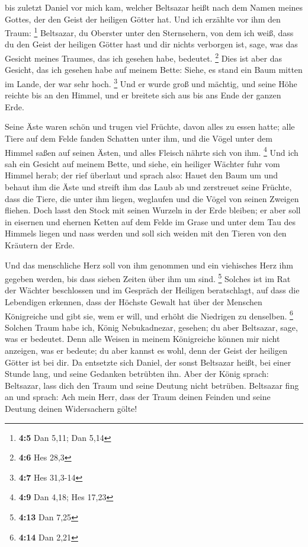  bis zuletzt Daniel vor mich kam, welcher Beltsazar heißt
nach dem Namen meines Gottes, der den Geist der heiligen Götter hat. Und
ich erzählte vor ihm den Traum: \footnote{\textbf{4:5} Dan 5,11; Dan
  5,14}  Beltsazar, du Oberster unter den Sternsehern, von
dem ich weiß, dass du den Geist der heiligen Götter hast und dir nichts
verborgen ist, sage, was das Gesicht meines Traumes, das ich gesehen
habe, bedeutet. \footnote{\textbf{4:6} Hes 28,3}  Dies ist
aber das Gesicht, das ich gesehen habe auf meinem Bette: Siehe, es stand
ein Baum mitten im Lande, der war sehr hoch. \footnote{\textbf{4:7} Hes
  31,3-14}  Und er wurde groß und mächtig, und seine Höhe
reichte bis an den Himmel, und er breitete sich aus bis ans Ende der
ganzen Erde.

 Seine Äste waren schön und trugen viel Früchte, davon
alles zu essen hatte; alle Tiere auf dem Felde fanden Schatten unter
ihm, und die Vögel unter dem Himmel saßen auf seinen Ästen, und alles
Fleisch nährte sich von ihm. \footnote{\textbf{4:9} Dan 4,18; Hes 17,23}
 Und ich sah ein Gesicht auf meinem Bette, und siehe, ein
heiliger Wächter fuhr vom Himmel herab;  der rief
überlaut und sprach also: Hauet den Baum um und behaut ihm die Äste und
streift ihm das Laub ab und zerstreuet seine Früchte, dass die Tiere,
die unter ihm liegen, weglaufen und die Vögel von seinen Zweigen
fliehen.  Doch lasst den Stock mit seinen Wurzeln in der
Erde bleiben; er aber soll in eisernen und ehernen Ketten auf dem Felde
im Grase und unter dem Tau des Himmels liegen und nass werden und soll
sich weiden mit den Tieren von den Kräutern der Erde.

 Und das menschliche Herz soll von ihm genommen und ein
viehisches Herz ihm gegeben werden, bis dass sieben Zeiten über ihm um
sind. \footnote{\textbf{4:13} Dan 7,25}  Solches ist im
Rat der Wächter beschlossen und im Gespräch der Heiligen beratschlagt,
auf dass die Lebendigen erkennen, dass der Höchste Gewalt hat über der
Menschen Königreiche und gibt sie, wem er will, und erhöht die Niedrigen
zu denselben. \footnote{\textbf{4:14} Dan 2,21}  Solchen
Traum habe ich, König Nebukadnezar, gesehen; du aber Beltsazar, sage,
was er bedeutet. Denn alle Weisen in meinem Königreiche können mir nicht
anzeigen, was er bedeute; du aber kannst es wohl, denn der Geist der
heiligen Götter ist bei dir.  Da entsetzte sich Daniel,
der sonst Beltsazar heißt, bei einer Stunde lang, und seine Gedanken
betrübten ihn. Aber der König sprach: Beltsazar, lass dich den Traum und
seine Deutung nicht betrüben. Beltsazar fing an und sprach: Ach mein
Herr, dass der Traum deinen Feinden und seine Deutung deinen
Widersachern gölte!

